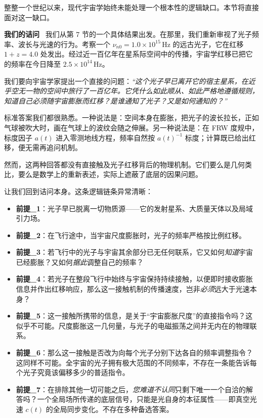\documentclass[12pt,leqno]{article}
\begin{document}
	整整一个世纪以来，现代宇宙学始终未能处理一个根本性的逻辑缺口。本节将直接面对这一缺口。
	
	\medskip
	

	\bigskip
	\textbf{我们的诘问}\,\,\,
	我们从第 7 节的一个具体结果出发。在那里，我们重新审视了光子频率、波长与光速的行为。考察一个 $\nu_{n0}=1.0\times10^{15}\,\mathrm{Hz}$ 的远古光子，它在红移 $1+z=4.0$ 处发出。经过近一百亿年在星系际空间中的传播，宇宙学红移已把它的频率在今日降至 $2.5\times10^{14}\,\mathrm{Hz}$。
	
	\medskip
	我们要向宇宙学家提出一个直接的问题：\emph{“这个光子早已离开它的宿主星系，在近乎空无一物的空间中旅行了一百亿年。它凭什么如此顺从、如此严格地遵循规则，知道自己必须随宇宙膨胀而红移？是谁通知了光子？又是如何通知的？”}
	
	\medskip
	标准答案我们都很熟悉。一种说法是：空间本身在膨胀，把光子的波长拉长，正如气球被吹大时，画在气球上的波纹会随之伸展。另一种说法是：在 FRW 度规中，标度因子 $a(t)$ 进入零测地线方程，频率自然按 $a(t)^{-1}$ 标度；计算既已给出红移，便无需再追问机制。
	
	\medskip
	然而，这两种回答都没有直接触及光子红移背后的物理机制。它们要么是几何类比，要么是数学上的重新表述，实际上遮蔽了底层的因果问题。
	
	\medskip
	让我们回到诘问本身。这条逻辑链条异常清晰：
	\begin{itemize}
		\item \textbf{前提\_1}：光子早已脱离一切物质源——它的发射星系、大质量天体以及局域引力场。
		
		\item \textbf{前提\_2}：在飞行途中，当宇宙尺度膨胀时，光子的频率严格按比例红移。
		
		\item \textbf{前提\_3}：若飞行中的光子与宇宙其余部分已无任何联系，它又如何\emph{知道}宇宙已经膨胀？又如何\emph{据此}调整自己的频率？
		
		\item \textbf{前提\_4}：若光子在整段飞行中始终与宇宙保持持续接触，以便即时接收膨胀信息并作出红移响应，那么这一接触机制的传播速度，岂非\emph{必须}远大于光速本身？
		
		\item \textbf{前提\_5}：这一接触所携带的信息，是关于“宇宙膨胀尺度”的直接指令吗？这似乎不可能。尺度膨胀这一几何量，与光子的电磁振荡之间并无内在的物理联系。
		
		\item \textbf{前提\_6}：那么这一接触是否改为向每个光子分别下达各自的频率调整指令？这同样不可能。全宇宙的光子拥有极大范围的不同频率，不存在一条能告诉每个光子究竟该偏移多少的普适指令。
		
		\item \textbf{前提\_7}：在排除其他一切可能之后，\emph{您难道不认同}只剩下唯一一个自洽的解答吗？一个全局场所传递的底层信号，只能是光自身的本征属性——即真空光速 $c(t)$ 的全局同步变化。不存在多种备选答案。
	\end{itemize}
	
\end{document}
